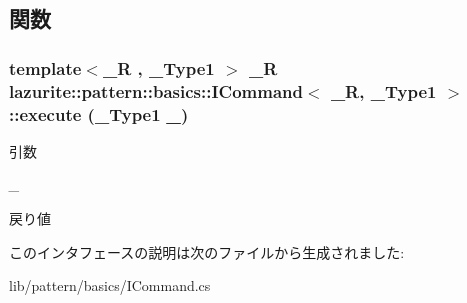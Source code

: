 \subsection{関数}
\hypertarget{interfacelazurite_1_1pattern_1_1basics_1_1_i_command_3_01___r_00_01___type1_01_4_a57b174444197a4151eaaa0690c1283ca}{
\subsubsection[{execute}]{\setlength{\rightskip}{0pt plus 5cm}template$<$\_\-R , \_\-Type1 $>$ \_\-R {\bf lazurite::pattern::basics::ICommand}$<$ \_\-R, \_\-Type1 $>$::execute (\_\-Type1 {\em \_})}}
\label{interfacelazurite_1_1pattern_1_1basics_1_1_i_command_3_01___r_00_01___type1_01_4_a57b174444197a4151eaaa0690c1283ca}

\begin{DoxyParams}{引数}
\item[{\em \_\-1}]\end{DoxyParams}
\begin{DoxyReturn}{戻り値}

\end{DoxyReturn}


このインタフェースの説明は次のファイルから生成されました:\begin{DoxyCompactItemize}
\item 
lib/pattern/basics/ICommand.cs\end{DoxyCompactItemize}
